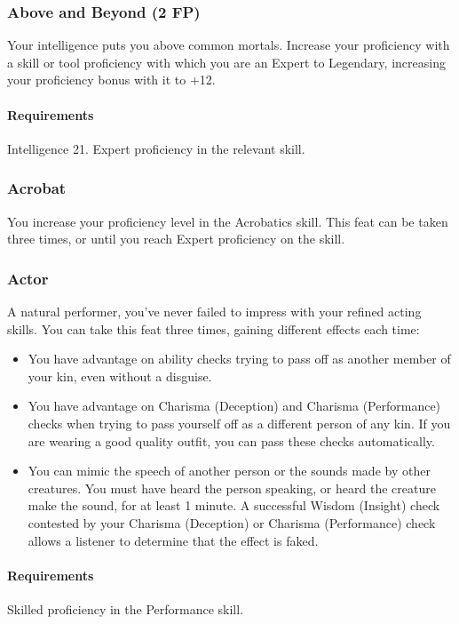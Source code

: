 \subsubsection{Above and Beyond (2 FP)} \label{feat::aboveandbeyond}
    Your intelligence puts you above common mortals.
    Increase your proficiency with a skill or tool proficiency with which you are an Expert to Legendary, increasing your proficiency bonus with it to +12.
    \paragraph{Requirements} Intelligence 21. Expert proficiency in the relevant skill.
\subsubsection{Acrobat} \label{feat::acrobat}
    You increase your proficiency level in the Acrobatics skill.
    This feat can be taken three times, or until you reach Expert proficiency on the skill.
\subsubsection{Actor} \label{feat::actor}
    A natural performer, you've never failed to impress with your refined acting skills.
    You can take this feat three times, gaining different effects each time:
    \begin{itemize}
        \item You have advantage on ability checks trying to pass off as another member of your kin, even without a disguise.
        \item You have advantage on Charisma (Deception) and Charisma (Performance) checks when trying to pass yourself off as a different person of any kin.
        If you are wearing a good quality outfit, you can pass these checks automatically.
        \item You can mimic the speech of another person or the sounds made by other creatures.
        You must have heard the person speaking, or heard the creature make the sound, for at least 1 minute.
        A successful Wisdom (Insight) check contested by your Charisma (Deception) or Charisma (Performance) check allows a listener to determine that the effect is faked.
    \end{itemize}
    \paragraph{Requirements} Skilled proficiency in the Performance skill.
